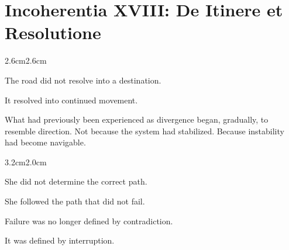 
\chapter*{Incoherentia XVIII: De Itinere et Resolutione}

\pagestyle{incoherence}

\vspace{2em}

\begin{adjustwidth}{2.6cm}{2.6cm}

The road did not resolve into a destination.

\medskip

It resolved into continued movement.

\vspace{2em}

What had previously been experienced as divergence began, gradually, to
resemble direction. Not because the system had stabilized. Because instability
had become navigable.

\vspace{3em}

\end{adjustwidth}

\begin{adjustwidth}{3.2cm}{2.0cm}

She did not determine the correct path.

\medskip

She followed the path that did not fail.

\medskip

Failure was no longer defined by contradiction.

\medskip

It was defined by interruption.

\vspace{3em}

\end{adjustwidth}

